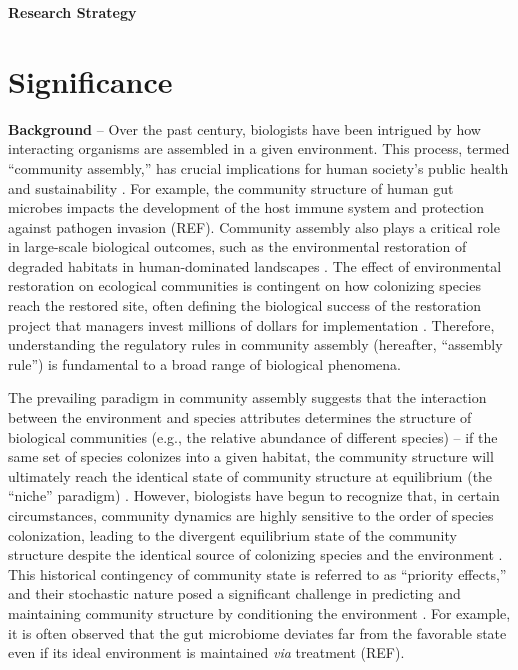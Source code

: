 \documentclass[12pt, class=article, crop=false]{standalone}
\begin{document}
\textbf{Research Strategy}

\section{Significance}

\textbf{Background} --
Over the past century, biologists have been intrigued by how interacting organisms are assembled in a given environment.
This process, termed ``community assembly,'' has crucial implications for human society's public health and sustainability \citep{leibold_metacommunity_2004, palmer_ecological_2014, fukami_historical_2015, ojima_priority_2022}.
For example, the community structure of human gut microbes impacts the development of the host immune system and protection against pathogen invasion (REF).
Community assembly also plays a critical role in large-scale biological outcomes, such as the environmental restoration of degraded habitats in human-dominated landscapes \citep{palmer_ecological_2014, koning_network_2020, terui_emergent_2021}.
The effect of environmental restoration on ecological communities is contingent on how colonizing species reach the restored site, often defining the biological success of the restoration project that managers invest millions of dollars for implementation \citep{palmer_ecological_2014, weidlich_priority_2021}.
Therefore, understanding the regulatory rules in community assembly (hereafter, ``assembly rule'') is fundamental to a broad range of biological phenomena.

The prevailing paradigm in community assembly suggests that the interaction between the environment and species attributes determines the structure of biological communities  (e.g., the relative abundance of different species) -- if the same set of species colonizes into a given habitat, the community structure will ultimately reach the identical state of community structure at equilibrium (the ``niche'' paradigm) \citep{chase_community_2003}.
However, biologists have begun to recognize that, in certain circumstances, community dynamics are highly sensitive to the order of species colonization, leading to the divergent equilibrium state of the community structure despite the identical source of colonizing species and the environment \citep{chase_community_2003, fukami_historical_2015}.
This historical contingency of community state is referred to as ``priority effects,'' and their stochastic nature posed a significant challenge in predicting and maintaining community structure by conditioning the environment \citep{fukami_historical_2015}.
For example, it is often observed that the gut microbiome deviates far from the favorable state even if its ideal environment is maintained \textit{via} treatment (REF).
\end{document}
